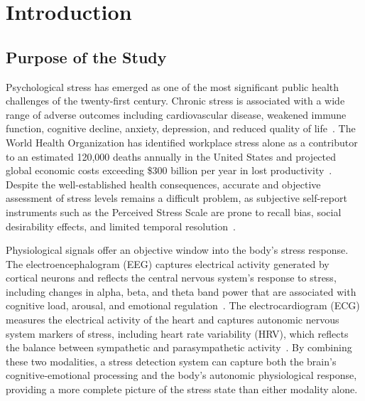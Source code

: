 \documentclass[12pt,letterpaper]{report}
\begin{document}
\clearpage
\listoffigures

\clearpage
{}

\chapter{Introduction}
\label{ch:introduction}

\section{Purpose of the Study}
\label{sec:purpose}

Psychological stress has emerged as one of the most significant public health challenges of the twenty-first century. Chronic stress is associated with a wide range of adverse outcomes including cardiovascular disease, weakened immune function, cognitive decline, anxiety, depression, and reduced quality of life~\cite{mcewen2008}. The World Health Organization has identified workplace stress alone as a contributor to an estimated 120,000 deaths annually in the United States and projected global economic costs exceeding \$300 billion per year in lost productivity~\cite{who2022}. Despite the well-established health consequences, accurate and objective assessment of stress levels remains a difficult problem, as subjective self-report instruments such as the Perceived Stress Scale are prone to recall bias, social desirability effects, and limited temporal resolution~\cite{cohen1983}.

Physiological signals offer an objective window into the body's stress response. The electroencephalogram (EEG) captures electrical activity generated by cortical neurons and reflects the central nervous system's response to stress, including changes in alpha, beta, and theta band power that are associated with cognitive load, arousal, and emotional regulation~\cite{alberdi2016}. The electrocardiogram (ECG) measures the electrical activity of the heart and captures autonomic nervous system markers of stress, including heart rate variability (HRV), which reflects the balance between sympathetic and parasympathetic activity~\cite{kim2018}. By combining these two modalities, a stress detection system can capture both the brain's cognitive-emotional processing and the body's autonomic physiological response, providing a more complete picture of the stress state than either modality alone.
\end{document}
